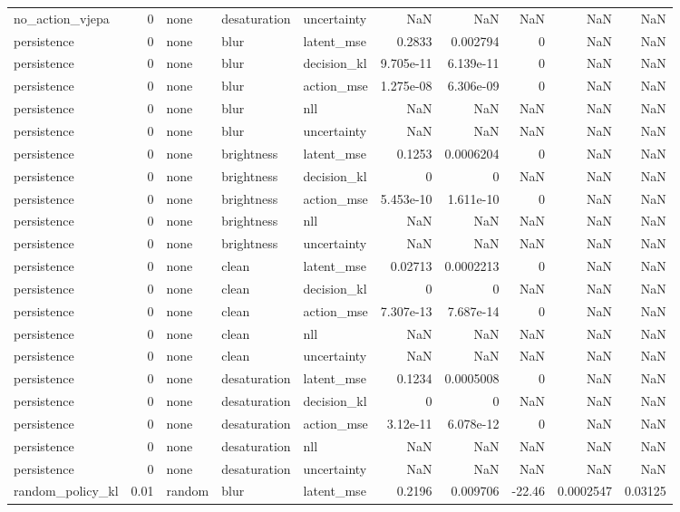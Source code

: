\begin{tabular}{lrlllrrrrr}
no\_action\_vjepa & 0 & none & desaturation & uncertainty & NaN & NaN & NaN & NaN & NaN \\
persistence & 0 & none & blur & latent\_mse & 0.2833 & 0.002794 & 0 & NaN & NaN \\
persistence & 0 & none & blur & decision\_kl & 9.705e-11 & 6.139e-11 & 0 & NaN & NaN \\
persistence & 0 & none & blur & action\_mse & 1.275e-08 & 6.306e-09 & 0 & NaN & NaN \\
persistence & 0 & none & blur & nll & NaN & NaN & NaN & NaN & NaN \\
persistence & 0 & none & blur & uncertainty & NaN & NaN & NaN & NaN & NaN \\
persistence & 0 & none & brightness & latent\_mse & 0.1253 & 0.0006204 & 0 & NaN & NaN \\
persistence & 0 & none & brightness & decision\_kl & 0 & 0 & NaN & NaN & NaN \\
persistence & 0 & none & brightness & action\_mse & 5.453e-10 & 1.611e-10 & 0 & NaN & NaN \\
persistence & 0 & none & brightness & nll & NaN & NaN & NaN & NaN & NaN \\
persistence & 0 & none & brightness & uncertainty & NaN & NaN & NaN & NaN & NaN \\
persistence & 0 & none & clean & latent\_mse & 0.02713 & 0.0002213 & 0 & NaN & NaN \\
persistence & 0 & none & clean & decision\_kl & 0 & 0 & NaN & NaN & NaN \\
persistence & 0 & none & clean & action\_mse & 7.307e-13 & 7.687e-14 & 0 & NaN & NaN \\
persistence & 0 & none & clean & nll & NaN & NaN & NaN & NaN & NaN \\
persistence & 0 & none & clean & uncertainty & NaN & NaN & NaN & NaN & NaN \\
persistence & 0 & none & desaturation & latent\_mse & 0.1234 & 0.0005008 & 0 & NaN & NaN \\
persistence & 0 & none & desaturation & decision\_kl & 0 & 0 & NaN & NaN & NaN \\
persistence & 0 & none & desaturation & action\_mse & 3.12e-11 & 6.078e-12 & 0 & NaN & NaN \\
persistence & 0 & none & desaturation & nll & NaN & NaN & NaN & NaN & NaN \\
persistence & 0 & none & desaturation & uncertainty & NaN & NaN & NaN & NaN & NaN \\
random\_policy\_kl & 0.01 & random & blur & latent\_mse & 0.2196 & 0.009706 & -22.46 & 0.0002547 & 0.03125 \\

\end{tabular}
